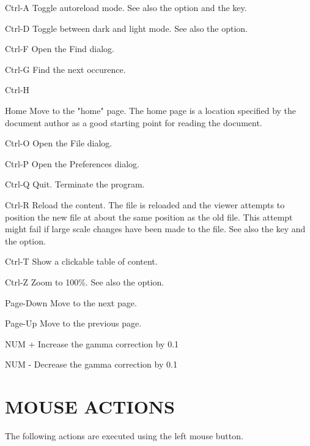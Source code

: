 \itemize
\item{Ctrl-A} Toggle autoreload mode. See also the  option  and  the  
              key.

\item{Ctrl-D} Toggle between dark and light mode. See also the  option.

\item{Ctrl-F} Open the Find dialog.

\item{Ctrl-G} Find the next occurence.

\item{Ctrl-H}\item{Home}
              Move to the "home" page. The home page is a  location  specified
              by  the document author as a good starting point for reading the
              document.
  
\item{Ctrl-O} Open the File dialog.

\item{Ctrl-P} Open the Preferences dialog.
  
\item{Ctrl-Q} Quit. Terminate the program.

\item{Ctrl-R} Reload the content. The file is reloaded and the viewer attempts
              to position the new file at about the same position as  the  old
              file.  This  attempt might fail if large scale changes have been
              made to the file. See also the  key and the  option.

\item{Ctrl-T} Show a clickable table of content.

\item{Ctrl-Z} Zoom to 100\%. See also the  option.


\item{Page-Down}
              Move to the next page.

\item{Page-Up}
              Move to the previous page.

\item{NUM +}  Increase the gamma correction by 0.1

\item{NUM -}  Decrease the gamma correction by 0.1
  
\enditemize


\section{MOUSE ACTIONS}
       The following actions are executed using the left mouse button.

